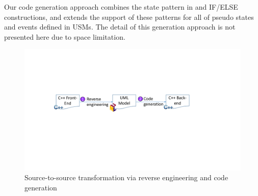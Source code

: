 Our code generation approach combines the state pattern in \cite{niaz_mapping_2004} and IF/ELSE constructions, and extends the support of these patterns for all of pseudo states and events defined in USMs.
The detail of this generation approach is not presented here due to space limitation.


\begin{figure}
	\centering
	\includegraphics[clip, trim=4.5cm 9.3cm 7.7cm 7.0cm, width=1.0\columnwidth]{figures/s2stransformation.pdf}
	\caption{Source-to-source transformation via reverse engineering and code generation} 
	\label{fig:s2stransformation}
\end{figure}